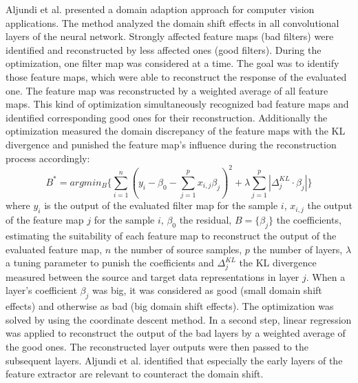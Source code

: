 Aljundi et al. \cite{Aljundi2016} presented a domain adaption approach for computer vision applications. The method analyzed the domain shift effects in all convolutional layers of the neural network. Strongly affected feature maps (bad filters) were identified and reconstructed by less affected ones (good filters). During the optimization, one filter map was considered at a time. The goal was to identify those feature maps, which were able to reconstruct the response of the evaluated one. The feature map was reconstructed by a weighted average of all feature maps. This kind of optimization simultaneously recognized bad feature maps and identified corresponding good ones for their reconstruction. Additionally the optimization measured the domain discrepancy of the feature maps with the KL divergence and punished the feature map's influence during the reconstruction process accordingly:  
\begin{equation}
    B^{*} = argmin_{B} \{ \sum_{i=1}^{n}( y_{i}-\beta_{0}-\sum_{j=1}^{p}x_{i,j}\beta_{j})^{2} + \lambda \sum_{j=1}^{p}|\Delta_{j}^{KL}\cdot \beta_{j}| \}
\end{equation}
where $y_{i}$ is the output of the evaluated filter map for the sample $i$, $x_{i,j}$ the output of the feature map $j$ for the sample $i$, $\beta_{0}$ the residual, $B = \{\beta_{j}\}$ the coefficients, estimating the suitability of each feature map to reconstruct the output of the evaluated feature map, $n$ the number of source samples, $p$ the number of layers, $\lambda$ a tuning parameter to punish the coefficients and $\Delta_{j}^{KL}$ the KL divergence measured between the source and target data representations in layer $j$. When a layer's coefficient  $\beta_{j}$ was big, it was considered as good (small domain shift effects) and otherwise as bad (big domain shift effects). The optimization was solved by using the coordinate descent method. In a second step, linear regression was applied to reconstruct the output of the bad layers by a weighted average of the good ones. The reconstructed layer outputs were then passed to the subsequent layers. Aljundi et al. \cite{Aljundi2016} identified that especially the early layers of the feature extractor are relevant to counteract the domain shift.

